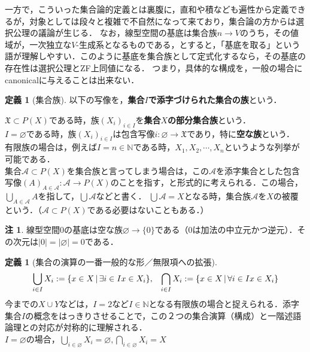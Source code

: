 \documentclass[uplatex, 12pt, dvipdfmx]{jsreport}
\theoremstyle{definition}
\newtheorem{definition}[theorem]{定義}
\newtheorem{remark}[theorem]{注}
\theoremstyle{StatementsWithStar}
\theoremstyle{StatementsWithStar2}
\theoremstyle{StatementsWithStar3}
\theoremstyle{StatementsWithCCirc}
\theoremstyle{definition}
\begin{document}
一方で，こういった集合論的定義とは裏腹に，直和や積なども遍性から定義できるが，対象としては段々と複雑で不自然になって来ており，集合論の方からは選択公理の議論が生じる．
なお，線型空間の基底は集合族$n\to V$のうち，その値域が，一次独立な$V$-生成系となるものである，とすると，「基底を取る」という語が理解しやすい．このように基底を集合族として定式化するなら，その基底の存在性は選択公理とZF上同値になる．
つまり，具体的な構成を，一般の場合にcanonicalに与えることは出来ない．

        \begin{definition}[集合族]
            以下の写像を，\textbf{集合$I$で添字づけられた集合の族}という．
            \begin{center}\end{center}
            $\mathfrak{X}\subset P(X)$である時，族$(X_i)_{i\in I}$を\textbf{集合$X$の部分集合族}という．\\
            $I=\varnothing$である時，族$(X_i)_{i\in I}$は包含写像$i:\varnothing\to\mathfrak{X}$であり，特に\textbf{空な族}という．\\
            有限族の場合は，例えば$I=n\in\mathbb{N}$である時，$X_1,X_2,\cdots,X_n$というような列挙が可能である．\\
            集合$\mathcal{A}\subset P(X)$を集合族と言ってしまう場合は，この$\mathcal{A}$を添字集合とした包含写像$(A)_{A\in\mathcal{A}}:\mathcal{A}\to P(X)$のことを指す，と形式的に考えられる．この場合，$\bigcup_{A\in\mathcal{A}}A$を指して，$\bigcup\mathcal{A}$などと書く．
            $\bigcup\mathcal{A}=X$となる時，集合族$\mathcal{A}$を$X$の被覆という．（$\mathcal{A}\subset P(X)$である必要はないこともある．）
        \end{definition}
        \begin{remark}
            線型空間$0$の基底は空な族$\varnothing\to\{ 0\}$である（$0$は加法の中立元かつ逆元）．その次元は$|0|=|\varnothing |=0$である．
        \end{remark}
        \begin{definition}[集合の演算の一番一般的な形／無限項への拡張]
            $$\bigcup_{i\in I}X_i:=\{ x\in X\, |\, \exists i\in I x\in X_i \},\hspace{3mm}\bigcap_{i\in I}X_i:=\{ x\in X\, |\, \forall i\in I x\in X_i \}$$
            今までの$X\cup Y$などは，$I=2$など$I\in\mathbb{N}$となる有限族の場合と捉えられる．添字集合$I$の概念をはっきりさせることで，この２つの集合演算（構成）と一階述語論理との対応が対称的に理解される．\\
            $I=\varnothing$の場合，$\bigcup_{i\in\varnothing} X_i=\varnothing ,\bigcap_{i\in\varnothing} X_i=X$
        \end{definition}
\end{document}
